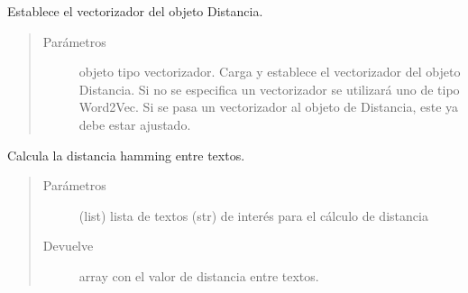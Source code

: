 \documentclass[letterpaper,10pt,openany,spanish]{sphinxmanual}
\begin{document}
\begin{fulllineitems}
\begin{fulllineitems}
\begin{quote}
\begin{description}
\end{description}\end{quote}

\end{fulllineitems}


\begin{fulllineitems}
\label{\detokenize{funciones/comparacion:comparacion.Distancia.establecer_vectorizador}}
Establece el vectorizador del objeto Distancia.
\begin{quote}\begin{description}
\item[{Parámetros}] \leavevmode
{} \textendash{} objeto tipo vectorizador. Carga y establece el 
vectorizador del objeto Distancia. Si no se especifica un 
vectorizador se utilizará uno de tipo Word2Vec. Si se pasa un 
vectorizador al objeto de Distancia, este ya debe estar ajustado.

\end{description}\end{quote}

\end{fulllineitems}


\begin{fulllineitems}
\label{\detokenize{funciones/comparacion:comparacion.Distancia.hamming}}
Calcula la distancia hamming entre textos.
\begin{quote}\begin{description}
\item[{Parámetros}] \leavevmode
{} \textendash{} (list) lista de textos (str) de interés para el 
cálculo de distancia

\item[{Devuelve}] \leavevmode
array con el valor de distancia entre textos.

\end{description}\end{quote}


\end{fulllineitems}
\end{fulllineitems}
\end{document}
